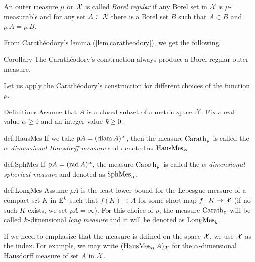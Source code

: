 An outer measure $\mu$ on $\mathcal{X}$ is called \emph{Borel regular} if any Borel set in $\mathcal{X}$ is $\mu$-measurable and for any set $A\subset \spc{X}$ there is a Borel set $B$ such that $A\subset B$ and $\mu\, A=\mu\, B$. 

From Carath\'eodory's lemma (\ref{lem:caratheodory}), we get the following.

\begin{thm}{Corollary}
The Carath\'eodory's construction always produce a Borel regular outer measure.
\end{thm}

Let us apply  the Carath\'eodory's construction for different choices of the function $\rho$.

\begin{thm}{Definitions}
Assume that $A$ is a closed subset of a metric space $\mathcal{X}$.
Fix a real value $\alpha\ge 0$ and an integer value $\kay\ge0$. 

\begin{subthm}{def:HausMes}
If we take $\upvarrho A=(\mathop{\rm diam}\nolimits A)^\upalpha$,
then the measure $\mathop{\rm Carath}\nolimits_\upvarrho$ is called the \emph{$\alpha$-dimensional Hausdorff measure} and denoted as $\mathop{\rm HausMes}\nolimits_\upalpha$.
\end{subthm}

\begin{subthm}{def:SphMes}
If $\upvarrho A=(\mathop{\rm rad}\nolimits A)^\upalpha$, the measure $\mathop{\rm Carath}\nolimits_\upvarrho$ is called the \emph{$\alpha$-dimensional spherical measure} and denoted as 
$\mathop{\rm SphMes}\nolimits_\upalpha$.
\end{subthm}


\begin{subthm}{def:LongMes}
Assume $\rho A$ is the least lower bound for the Lebesgue measure of a compact set $K$ in $\EE^\kay$ 
such that $f(K)\supset A$ for some short map $f\:K\to \spc{X}$
(if no such $K$ exists, 
we set $\rho A=\infty$).
For this choice of $\rho$,
the measure $\mathop{\rm Carath}\nolimits_\upvarrho$ will be called $\kay$-dimensional 
\emph{long measure} 
and it will be denoted as $\LongMes_\kay$.
\end{subthm}

If we need to emphasize that the measure is defined on the space $\mathcal{X}$, we use $\mathcal{X}$ as the index.
For example, we may write $(\mathop{\rm HausMes}\nolimits_\upalpha A)_{\mathcal{X}}$ for the $\alpha$-dimensional Hausdorff measure of set $A$ in $\mathcal{X}$.
\end{thm}

